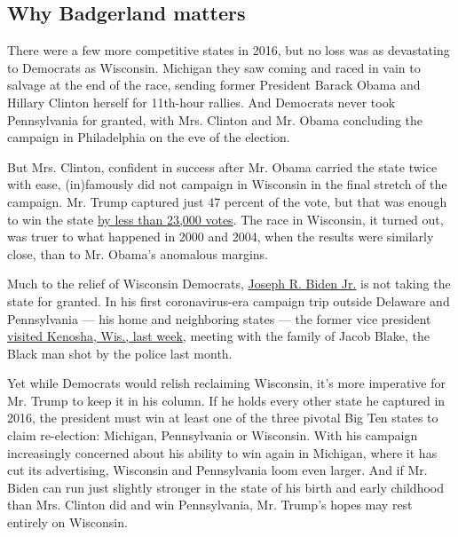 \hypertarget{why-badgerland-matters}{%
\subsection{Why Badgerland matters}\label{why-badgerland-matters}}

There were a few more competitive states in 2016, but no loss was as
devastating to Democrats as Wisconsin. Michigan they saw coming and
raced in vain to salvage at the end of the race, sending former
President Barack Obama and Hillary Clinton herself for 11th-hour
rallies. And Democrats never took Pennsylvania for granted, with Mrs.
Clinton and Mr. Obama concluding the campaign in Philadelphia on the eve
of the election.

But Mrs. Clinton, confident in success after Mr. Obama carried the state
twice with ease, (in)famously did not campaign in Wisconsin in the final
stretch of the campaign. Mr. Trump captured just 47 percent of the vote,
but that was enough to win the state
\href{https://www.nytimes3xbfgragh.onion/elections/2016/results/wisconsin}{by
less than 23,000 votes}. The race in Wisconsin, it turned out, was truer
to what happened in 2000 and 2004, when the results were similarly
close, than to Mr. Obama's anomalous margins.

Much to the relief of Wisconsin Democrats,
\href{https://www.nytimes3xbfgragh.onion/interactive/2020/us/elections/joe-biden.html}{Joseph
R. Biden Jr.} is not taking the state for granted. In his first
coronavirus-era campaign trip outside Delaware and Pennsylvania --- his
home and neighboring states --- the former vice president
\href{https://www.nytimes3xbfgragh.onion/2020/09/03/us/politics/joe-biden-kenosha.html}{visited
Kenosha, Wis., last week}, meeting with the family of Jacob Blake, the
Black man shot by the police last month.

Yet while Democrats would relish reclaiming Wisconsin, it's more
imperative for Mr. Trump to keep it in his column. If he holds every
other state he captured in 2016, the president must win at least one of
the three pivotal Big Ten states to claim re-election: Michigan,
Pennsylvania or Wisconsin. With his campaign increasingly concerned
about his ability to win again in Michigan, where it has cut its
advertising, Wisconsin and Pennsylvania loom even larger. And if Mr.
Biden can run just slightly stronger in the state of his birth and early
childhood than Mrs. Clinton did and win Pennsylvania, Mr. Trump's hopes
may rest entirely on Wisconsin.

